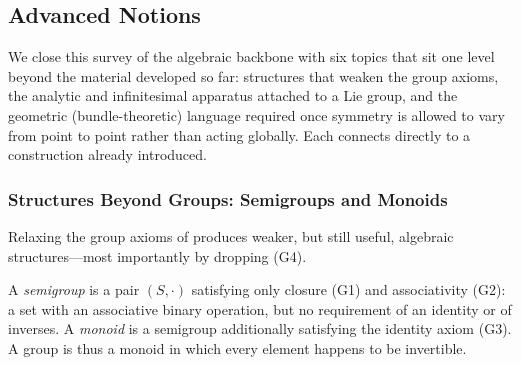 \documentclass[mathematics,review,submit,moreauthors]{Definitions/mdpi}
\begin{document}

\subsection{Advanced Notions}
\label{sec:advanced-notions}

We close this survey of the algebraic backbone with six topics that sit one
level beyond the material developed so far: structures that weaken the group
axioms, the analytic and infinitesimal apparatus attached to a Lie group,
and the geometric (bundle-theoretic) language required once symmetry is
allowed to vary from point to point rather than acting globally. Each
connects directly to a construction already introduced.

\subsubsection{Structures Beyond Groups: Semigroups and Monoids}
\label{subsec:beyond-groups}

Relaxing the group axioms of  produces weaker, but
still useful, algebraic structures---most importantly by dropping (G4).

\begin{Definition}
\label{def:semigroup-monoid}
A \emph{semigroup} is a pair $(S,\cdot)$ satisfying only closure (G1) and
associativity (G2): a set with an associative binary operation, but no
requirement of an identity or of inverses. A \emph{monoid} is a semigroup
additionally satisfying the identity axiom (G3). A group is thus a monoid in
which every element happens to be invertible.
\end{Definition}
\end{document}
